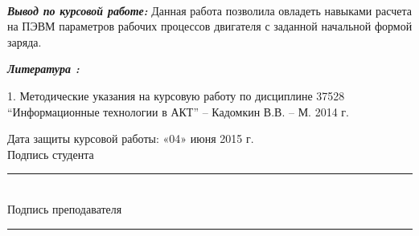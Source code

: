 \documentclass{article}
\begin{document}
~\\

\begin{large}
\textbf{\textit{Вывод по курсовой работе:}} Данная работа позволила овладеть навыками расчета на ПЭВМ параметров рабочих процессов двигателя с заданной начальной формой заряда. 

\begin{center}
\textbf{\textit{Литература :}}\\
\end{center}
1. Методические указания на курсовую работу по дисциплине 37528 “Информационные технологии в АКТ” – Кадомкин В.В. – М. 2014 г.
\begin{flushright}
Дата защиты курсовой работы: «04» июня 2015 г.\\
Подпись студента\rule{4cm}{0.01pt} \\
Подпись преподавателя\rule{4cm}{0.01pt} \\
\end{flushright}
\end{large}
\end{document}
